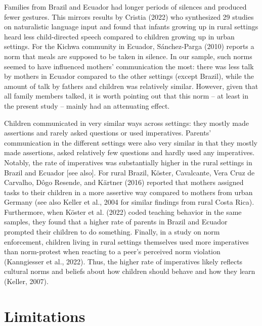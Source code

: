 \documentclass[
  man,floatsintext]{apa6}
\begin{document}
Families from Brazil and Ecuador had longer periods of silences and produced fewer gestures. This mirrors results by Cristia (2022) who synthesized 29 studies on naturalistic language input and found that infants growing up in rural settings heard less child-directed speech compared to children growing up in urban settings. For the Kichwa community in Ecuador, Sánchez-Parga (2010) reports a norm that meals are supposed to be taken in silence. In our sample, such norms seemed to have influenced mothers' communication the most: there was less talk by mothers in Ecuador compared to the other settings (except Brazil), while the amount of talk by fathers and children was relatively similar. However, given that all family members talked, it is worth pointing out that this norm -- at least in the present study -- mainly had an attenuating effect.

Children communicated in very similar ways across settings: they mostly made assertions and rarely asked questions or used imperatives. Parents' communication in the different settings were also very similar in that they mostly made assertions, asked relatively few questions and hardly used any imperatives. Notably, the rate of imperatives was substantially higher in the rural settings in Brazil and Ecuador {[}see also{]}. For rural Brazil, Köster, Cavalcante, Vera Cruz de Carvalho, Dôgo Resende, and Kärtner (2016) reported that mothers assigned tasks to their children in a more assertive way compared to mothers from urban Germany (see also Keller et al., 2004 for similar findings from rural Costa Rica). Furthermore, when Köster et al. (2022) coded teaching behavior in the same samples, they found that a higher rate of parents in Brazil and Ecuador prompted their children to do something. Finally, in a study on norm enforcement, children living in rural settings themselves used more imperatives than norm-protest when reacting to a peer's perceived norm violation (Kanngiesser et al., 2022). Thus, the higher rate of imperatives likely reflects cultural norms and beliefs about how children should behave and how they learn (Keller, 2007).

\hypertarget{limitations}{%
\section{Limitations}\label{limitations}}
\end{document}

